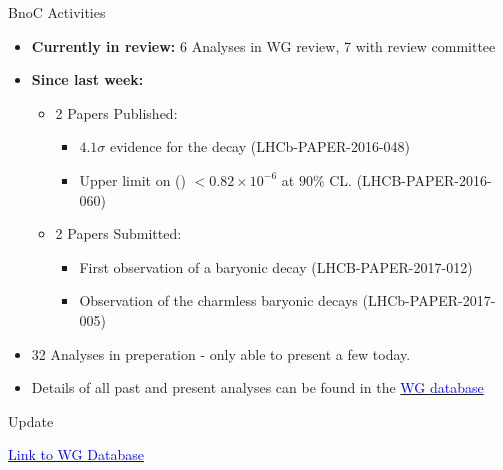 \documentclass{beamer}
\begin{document}
\begin{frame}{BnoC Activities}
  \begin{itemize}
  \item \textbf{Currently in review:}
    6 Analyses in WG review, 7 with review committee %
  \item \textbf{Since last \lhcb week:}
    \begin{itemize}
    \item 2 Papers Published:
      \begin{itemize}
      \item $4.1\sigma$ evidence for the decay \decay{\Bp}{\proton \Lbar} (LHCb-PAPER-2016-048)\\
      \item Upper limit on \BF(\decay{\Bs}{\phiz \etapr}) $< 0.82 \times 10^{-6}$ at $90\%$ CL. (LHCB-PAPER-2016-060)
      \end{itemize}
    \item 2 Papers Submitted:
      \begin{itemize}
      \item First observation of a baryonic \Bs decay (LHCB-PAPER-2017-012)
      \item Observation of the charmless baryonic decays  (LHCb-PAPER-2017-005)
      \end{itemize}
    \end{itemize}
  \item 32 Analyses in preperation - only able to present a few today.
  \item Details of all past and present analyses can be found in the \href{https://lhcb-wg.web.cern.ch/lhcb-WG/bnoc/list.py}{\textcolor{blue}{WG database}}
  \end{itemize}
\end{frame}

\begin{frame}
  \begin{center}
    \begin{block}{}
      \centering \Huge {} Update
    \end{block}
    \href{https://lhcb-wg.web.cern.ch/lhcb-WG/bnoc/listentry.py?name=2011\%2B12+B+-\%3E+p+pbar+BFs\&cat=analysis}{\textcolor{blue}{Link to WG Database}}
  \end{center}
\end{frame}
\end{document}
